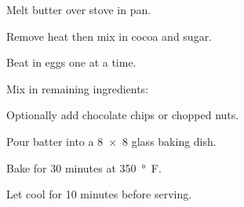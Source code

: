 

Melt butter over stove in pan.

\begin{ingredients}
\end{ingredients}

Remove heat then mix in cocoa and sugar.

\begin{ingredients}
\end{ingredients}

Beat in eggs one at a time.

\begin{ingredients}
\end{ingredients}

Mix in remaining ingredients:

\begin{ingredients}
\end{ingredients}

Optionally add chocolate chips or chopped nuts.

\begin{ingredients}
\end{ingredients}

Pour batter into a \SI[product-units = single]{8 x 8}{} glass baking dish.

Bake for 30 minutes at \SI{350}{°F}.

Let cool for 10 minutes before serving.
